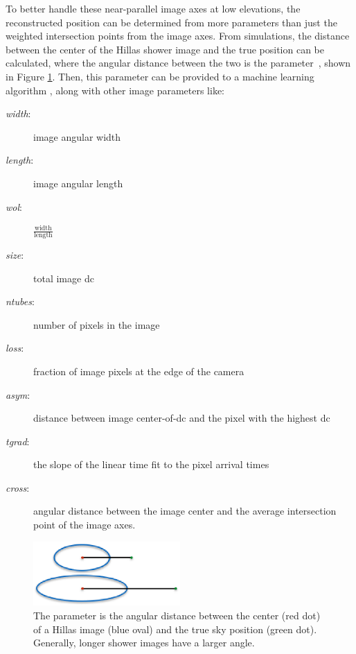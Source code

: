     To better handle these near-parallel image axes at low elevations, the reconstructed position can be determined from more parameters than just the weighted intersection points from the image axes.
    From simulations, the distance between the center of the Hillas shower image and the true position can be calculated, where the angular distance between the two is the \disp{} parameter~\cite{Senturk:2011}, shown in Figure \ref{fig:dispdiagram}.
    Then, this \disp{} parameter can be provided to a machine learning algorithm \cite{Beilicke2012NIM}, along with other image parameters like:
    \begin{description}
      \item[\textit{width}:] image angular width
      \item[\textit{length}:] image angular length
      \item[\textit{wol}:] $\frac{\textrm{width}}{\textrm{length}}$
      \item[\textit{size}:] total image dc
      \item[\textit{ntubes}:] number of pixels in the image
      \item[\textit{loss}:] fraction of image pixels at the edge of the camera
      \item[\textit{asym}:] distance between image center-of-dc and the pixel with the highest dc
      \item[\textit{tgrad}:] the slope of the linear time fit to the pixel arrival times
      \item[\textit{cross}:] angular distance between the image center and the average intersection point of the image axes.
    \end{description}


    \begin{figure}[ht]
      \centering
      \includegraphics[width=0.5\textwidth]{images/disp_parameter_cropped.eps}
      \caption[Angular Reconstruction Disp]{
        The \disp{} parameter is the angular distance between the center (red dot) of a Hillas image (blue oval) and the true sky position (green dot).
        Generally, longer shower images have a larger \disp{} angle.
      }
      \label{fig:dispdiagram}
    \end{figure}


